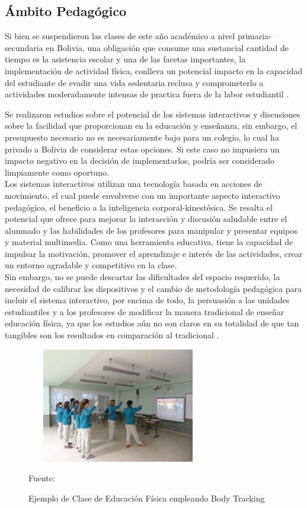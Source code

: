 \subsection{Ámbito Pedagógico}

Si bien se suspendieron las clases de este año académico a nivel primaria-secundaria en Bolivia, una obligación que consume una sustancial cantidad de tiempo es la asistencia escolar y una de las facetas importantes, la implementación de actividad física, conlleva un potencial impacto en la capacidad del estudiante de evadir una vida sedentaria reclusa y comprometerlo a actividades moderadamente intensas de practica fuera de la labor estudiantil \cite{daly2018systematic}.

Se realizaron estudios sobre el potencial de los sistemas interactivos y discusiones sobre la facilidad que proporcionan en la educación y enseñanza, sin embargo, el presupuesto necesario no es necesariamente bajo para un colegio, lo cual ha privado a Bolivia de considerar estas opciones. Si este caso no impusiera un impacto negativo en la decisión de implementarlos, podría ser considerado limpiamente como oportuno.\\

Los sistemas interactivos utilizan una tecnología basada en acciones de movimiento, el cual puede envolverse con un importante aspecto interactivo pedagógico, el beneficio a la inteligencia corporal-kinestésica. Se resalta el potencial que ofrece para mejorar la interacción y discusión saludable entre el alumnado y las habilidades de los profesores para manipular y presentar equipos y material multimedia. Como una herramienta educativa, tiene la capacidad de impulsar la motivación, promover el aprendizaje e interés de las actividades, crear un entorno agradable y competitivo en la clase\cite{pirie1995meaning}.\\

Sin embargo, no se puede descartar las dificultades del espacio requerido, la necesidad de calibrar los dispositivos y el cambio de metodología pedagógica para incluir el sistema interactivo, por encima de todo, la persuasión a las unidades estudiantiles y a los profesores de modificar la manera tradicional de enseñar educación física, ya que los estudios aún no son claros en su totalidad de que tan tangibles son los resultados en comparación al tradicional \cite{daly2018systematic}. \\
\begin{figure}[t!]
	\centering
	\includegraphics[width=8cm,height=5cm,]{./Images/kinectexampleschool.jpg}
	\caption{Ejemplo de Clase de Educación Física empleando Body Tracking}
	\footnotesize Fuente: \cite{kinectexampleschool}
	\label{claseEF}
\end{figure}

